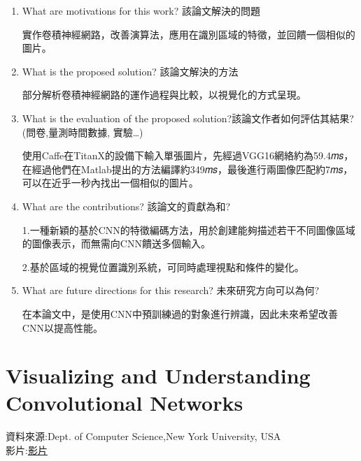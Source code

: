 \begin{enumerate}
\item  What are motivations for this work? 該論文解決的問題  

實作卷積神經網路，改善演算法，應用在識別區域的特徵，並回饋一個相似的圖片。

\item  What is the proposed solution? 該論文解決的方法

部分解析卷積神經網路的運作過程與比較，以視覺化的方式呈現。

\item  What is the evaluation of the proposed solution?該論文作者如何評估其結果? (問卷,量測時間數據, 實驗…)

使用Caffe在TitanX的設備下輸入單張圖片，先經過VGG16網絡約為59.4𝑚𝑠，在經過他們在Matlab提出的方法編譯約349𝑚𝑠，最後進行兩圖像匹配約7𝑚𝑠，可以在近乎一秒內找出一個相似的圖片。

\item  What are the contributions? 該論文的貢獻為和?

1.一種新穎的基於CNN的特徵編碼方法，用於創建能夠描述若干不同圖像區域的圖像表示，而無需向CNN饋送多個輸入。

2.基於區域的視覺位置識別系統，可同時處理視點和條件的變化。

\item  What are future directions for this research? 未來研究方向可以為何?

在本論文中，是使用CNN中預訓練過的對象進行辨識，因此未來希望改善CNN以提高性能。


\end{enumerate}


\section{Visualizing and Understanding Convolutional Networks}
資料來源:{Dept. of Computer Science,New York University, USA\cite{DBLP:journals/corr/ZeilerF13}}
\\
影片:\href{1331_VI.mp4}{影片}
      
